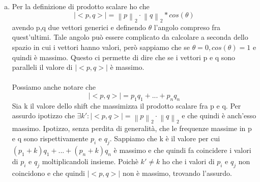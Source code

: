 \documentclass{article}
\newcommand{\norm}[1]{\left\lVert#1\right\rVert_2}
\begin{document}
\begin{enumerate}[a.]
    \item Per la definizione di prodotto scalare ho che 
        \begin{equation}
            |<p,q>| = \norm{p} \cdot \norm{q} * cos(\theta)
        \end{equation}
        avendo p,q due vettori generici e definendo $\theta$ l'angolo compreso fra quest'ultimi. Tale angolo può essere complicato da calcolare a seconda dello spazio in cui i vettori hanno valori, però sappiamo che se $\theta = 0, cos(\theta) = 1$ e quindi è massimo. Questo ci permette di dire che se i vettori p e q sono paralleli il valore di $|<p,q>|$ è massimo.\\\\
        Possiamo anche notare che 
        \begin{equation}
            |<p,q>| = p_1q_1 + ... + p_nq_n
        \end{equation}
        Sia k il valore dello shift che massimizza il prodotto scalare fra p e q. Per assurdo ipotizzo che $\exists k' : |<p,q>| = \norm{p} \cdot \norm{q}$ e che quindi è anch'esso massimo. Ipotizzo, senza perdita di generalità, che le frequenze massime in p e q sono rispettivamente $p_i$ e $q_j$. Sappiamo che k è il valore per cui $(p_1+k)q_1 + ... + (p_n+k)q_n$ è massimo e che quindi fa coincidere i valori di $p_i$ e $q_j$ moltiplicandoli insieme. Poichè $k' \neq k$ ho che i valori di $p_i$ e $q_j$ non coincidono e che quindi $|<p,q>|$ non è massimo, trovando l'assurdo.
\end{enumerate}
\end{document}
